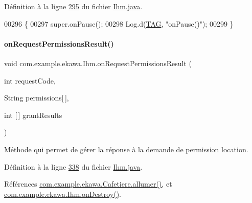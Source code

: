Définition à la ligne \hyperlink{_ihm_8java_source_l00295}{295} du fichier \hyperlink{_ihm_8java_source}{Ihm.\+java}.


\begin{DoxyCode}
00296     \{
00297         super.onPause();
00298         Log.d(\hyperlink{classcom_1_1example_1_1ekawa_1_1_ihm_a95cd92c2acaf9f8982302da08d94f9aa}{TAG}, \textcolor{stringliteral}{"onPause()"});
00299     \}
\end{DoxyCode}
\mbox{\label{classcom_1_1example_1_1ekawa_1_1_ihm_a708f7d3adb02a942cb67a5d6ec42b64f}} 
\paragraph{\texorpdfstring{on\+Request\+Permissions\+Result()}{onRequestPermissionsResult()}}
{\footnotesize\ttfamily void com.\+example.\+ekawa.\+Ihm.\+on\+Request\+Permissions\+Result (\begin{DoxyParamCaption}\item[{int}]{request\+Code,  }\item[{String}]{permissions\mbox{[}$\,$\mbox{]},  }\item[{int \mbox{[}$\,$\mbox{]}}]{grant\+Results }\end{DoxyParamCaption})}



Méthode qui permet de gérer la réponse à la demande de permission location. 



Définition à la ligne \hyperlink{_ihm_8java_source_l00338}{338} du fichier \hyperlink{_ihm_8java_source}{Ihm.\+java}.



Références \hyperlink{_cafetiere_8java_source_l00414}{com.\+example.\+ekawa.\+Cafetiere.\+allumer()}, et \hyperlink{_ihm_8java_source_l00315}{com.\+example.\+ekawa.\+Ihm.\+on\+Destroy()}.


